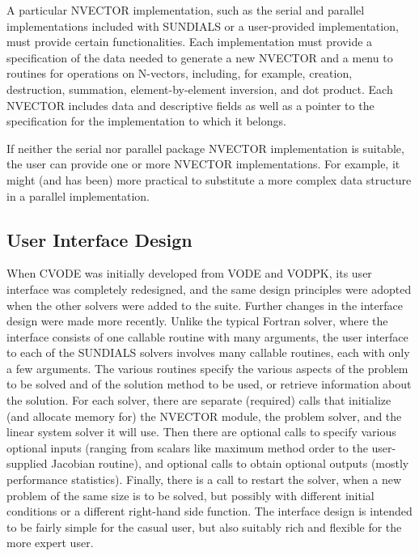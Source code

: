 A particular NVECTOR implementation, such as the serial and parallel
implementations included with SUNDIALS or a user-provided implementation,
must provide certain functionalities. Each implementation must provide a
specification of the data needed to generate a new NVECTOR and a menu to
routines for operations on N-vectors, including, for example, creation,
destruction, summation, element-by-element inversion, and dot product. Each
NVECTOR includes data and descriptive fields as well as a pointer to the
specification for the implementation to which it belongs.

If neither the serial nor parallel package NVECTOR implementation is
suitable, the user can provide one or more NVECTOR implementations.  For
example, it might (and has been) more practical to substitute a more complex
data structure in a parallel implementation.

\subsection{User Interface Design}

When CVODE was initially developed from VODE and VODPK, its user
interface was completely redesigned, and the same design principles
were adopted when the other solvers were added to the suite.  Further
changes in the interface design were made more recently.  Unlike the
typical Fortran solver, where the interface consists of one callable
routine with many arguments, the user interface to each of the
SUNDIALS solvers involves many callable routines, each with only a few
arguments.  The various routines specify the various aspects of the
problem to be solved and of the solution method to be used, or
retrieve information about the solution.  For each solver, there are
separate (required) calls that initialize (and allocate memory for)
the NVECTOR module, the problem solver, and the linear system solver
it will use.  Then there are optional calls to specify various
optional inputs (ranging from scalars like maximum method order to the
user-supplied Jacobian routine), and optional calls to obtain optional
outputs (mostly performance statistics).  Finally, there is a call to
restart the solver, when a new problem of the same size is to be
solved, but possibly with different initial conditions or a different
right-hand side function.  The interface design is intended to be
fairly simple for the casual user, but also suitably rich and flexible
for the more expert user.
